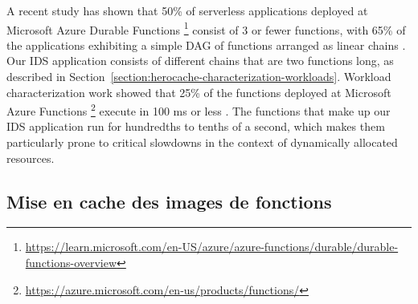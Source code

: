 A recent study has shown that 50\% of serverless applications deployed at Microsoft Azure Durable Functions \footnote{\href{https://learn.microsoft.com/en-US/azure/azure-functions/durable/durable-functions-overview}{https://learn.microsoft.com/en-US/azure/azure-functions/durable/durable-functions-overview}} consist of 3 or fewer functions, with 65\% of the applications exhibiting a simple DAG of functions arranged as linear chains \cite{mahgoubORIONThreeRights}. Our IDS application consists of different chains that are two functions long, as described in Section~\ref{section:herocache-characterization-workloads}. Workload characterization work showed that 25\% of the functions deployed at Microsoft Azure Functions \footnote{\href{https://azure.microsoft.com/en-us/products/functions/}{https://azure.microsoft.com/en-us/products/functions/}} execute in 100 ms or less \cite{shahradServerlessWildCharacterizing}. The functions that make up our IDS application run for hundredths to tenths of a second, which makes them particularly prone to critical slowdowns in the context of dynamically allocated resources.

\subsection{Mise en cache des images de fonctions}
\label{section:herocache-background-cache}



